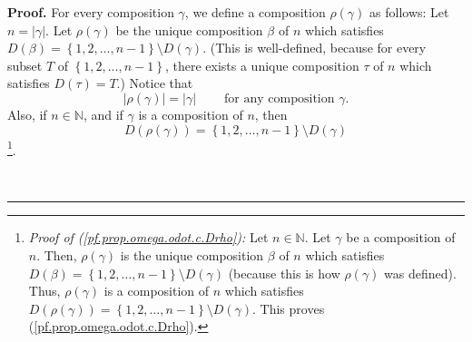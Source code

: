 \documentclass
[numbers=enddot,12pt,final,onecolumn,notitlepage,abstracton]{scrartcl}%
\theoremstyle{definition}
\newenvironment{proof}[1][Proof]{\noindent\textbf{#1.} }{\ \rule{0.5em}{0.5em}}
\newenvironment{verlong}{}{}
\begin{document}
\begin{verlong}
\begin{proof}
For every composition $\gamma$, we define a composition $\rho\left(
\gamma\right)  $ as follows: Let $n=\left\vert \gamma\right\vert $. Let
$\rho\left(  \gamma\right)  $ be the unique composition $\beta$ of $n$ which
satisfies $D\left(  \beta\right)  =\left\{  1,2,\ldots,n-1\right\}  \setminus
D\left(  \gamma\right)  $. (This is well-defined, because for every subset $T$
of $\left\{  1,2,\ldots,n-1\right\}  $, there exists a unique composition
$\tau$ of $n$ which satisfies $D\left(  \tau\right)  =T$.) Notice that%
\begin{equation}
\left\vert \rho\left(  \gamma\right)  \right\vert =\left\vert \gamma
\right\vert \ \ \ \ \ \ \ \ \ \ \text{for any composition }\gamma.
\label{pf.prop.omega.odot.rho1}%
\end{equation}
Also, if $n\in\mathbb{N}$, and if $\gamma$ is a composition of $n$, then%
\begin{equation}
D\left(  \rho\left(  \gamma\right)  \right)  =\left\{  1,2,\ldots,n-1\right\}
\setminus D\left(  \gamma\right)  \label{pf.prop.omega.odot.c.Drho}%
\end{equation}
\footnote{\textit{Proof of (\ref{pf.prop.omega.odot.c.Drho}):} Let
$n\in\mathbb{N}$. Let $\gamma$ be a composition of $n$. Then, $\rho\left(
\gamma\right)  $ is the unique composition $\beta$ of $n$ which satisfies
$D\left(  \beta\right)  =\left\{  1,2,\ldots,n-1\right\}  \setminus D\left(
\gamma\right)  $ (because this is how $\rho\left(  \gamma\right)  $ was
defined). Thus, $\rho\left(  \gamma\right)  $ is a composition of $n$ which
satisfies $D\left(  \rho\left(  \gamma\right)  \right)  =\left\{
1,2,\ldots,n-1\right\}  \setminus D\left(  \gamma\right)  $. This proves
(\ref{pf.prop.omega.odot.c.Drho}).}.


\end{proof}
\end{verlong}
\end{document}
